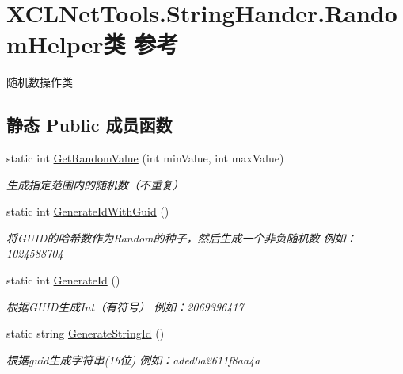 \hypertarget{class_x_c_l_net_tools_1_1_string_hander_1_1_random_helper}{}\section{X\+C\+L\+Net\+Tools.\+String\+Hander.\+Random\+Helper类 参考}
\label{class_x_c_l_net_tools_1_1_string_hander_1_1_random_helper}


随机数操作类  


\subsection*{静态 Public 成员函数}
\begin{DoxyCompactItemize}
\item 
static int \hyperlink{class_x_c_l_net_tools_1_1_string_hander_1_1_random_helper_a6b5009f83de1931fe3fd19142aa53586}{Get\+Random\+Value} (int min\+Value, int max\+Value)
\begin{DoxyCompactList}\small\item\em 生成指定范围内的随机数（不重复） \end{DoxyCompactList}\item 
static int \hyperlink{class_x_c_l_net_tools_1_1_string_hander_1_1_random_helper_a73f5f5edf29e9226b6b00cd7ad471ea7}{Generate\+Id\+With\+Guid} ()
\begin{DoxyCompactList}\small\item\em 将\+G\+U\+I\+D的哈希数作为\+Random的种子，然后生成一个非负随机数 例如：1024588704 \end{DoxyCompactList}\item 
static int \hyperlink{class_x_c_l_net_tools_1_1_string_hander_1_1_random_helper_adfcadc291d76f970c4d422210794f8ac}{Generate\+Id} ()
\begin{DoxyCompactList}\small\item\em 根据\+G\+U\+I\+D生成\+Int（有符号） 例如：2069396417 \end{DoxyCompactList}\item 
static string \hyperlink{class_x_c_l_net_tools_1_1_string_hander_1_1_random_helper_a51813c8b3782151227ae2db0881fcd7c}{Generate\+String\+Id} ()
\begin{DoxyCompactList}\small\item\em 根据guid生成字符串(16位) 例如：aded0a2611f8aa4a \end{DoxyCompactList}\item 

\end{DoxyCompactItemize}
